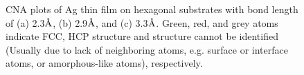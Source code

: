 \begingroup
\begin{figure}[!ht]
  \centering
  \label{Chap:Ag/ZnO:fig:7a}
  \label{Chap:Ag/ZnO:fig:7b}
  \label{Chap:Ag/ZnO:fig:7c}
\caption[Common neighbor analysis plots of Ag thin film on hexagonal substrates.]{\ac{CNA} plots of Ag thin film on hexagonal substrates with bond length of (a) 2.3$\mbox{\normalfont\AA}$, (b) 2.9$\mbox{\normalfont\AA}$, and (c) 3.3$\mbox{\normalfont\AA}$. Green, red, and grey atoms indicate \ac{FCC}, \ac{HCP} structure and structure cannot be identified (Usually due to lack of neighboring atoms, e.g. surface or interface atoms, or amorphous-like atoms), respectively.}
\label{Chap:Ag/ZnO:fig7}
\end{figure}
\endgroup

